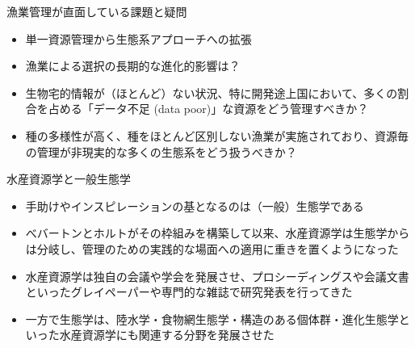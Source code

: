 \documentclass[
  ignorenonframetext,
]{beamer}
\providecommand{\tightlist}{%
  \setlength{\itemsep}{0pt}\setlength{\parskip}{0pt}}
\newcommand{\vspacelarge}{\vspace{6mm}}
\begin{document}
\begin{frame}{漁業管理が直面している課題と疑問}
\protect\hypertarget{ux6f01ux696dux7ba1ux7406ux304cux76f4ux9762ux3057ux3066ux3044ux308bux8ab2ux984cux3068ux7591ux554f}{}

\begin{itemize}
\tightlist
\item
  単一資源管理から生態系アプローチへの拡張\\
  \vspacelarge
\item
  漁業による選択の長期的な進化的影響は？\\
  \vspacelarge
\item
  生物宅的情報が（ほとんど）ない状況、特に開発途上国において、多くの割合を占める「データ不足
  (data poor)」な資源をどう管理すべきか？\\
  \vspacelarge
\item
  種の多様性が高く、種をほとんど区別しない漁業が実施されており、資源毎の管理が非現実的な多くの生態系をどう扱うべきか？
\end{itemize}

\end{frame}

\begin{frame}{水産資源学と一般生態学}
\protect\hypertarget{ux6c34ux7523ux8cc7ux6e90ux5b66ux3068ux4e00ux822cux751fux614bux5b66}{}

\begin{itemize}
\tightlist
\item
  手助けやインスピレーションの基となるのは（一般）生態学である\\
  \vspacelarge
\item
  べバートンとホルトがその枠組みを構築して以来、水産資源学は生態学からは分岐し、管理のための実践的な場面への適用に重きを置くようになった\\
  \vspacelarge
\item
  水産資源学は独自の会議や学会を発展させ、プロシーディングスや会議文書といったグレイペーパーや専門的な雑誌で研究発表を行ってきた\\
  \vspacelarge
\item
  一方で生態学は、陸水学・食物網生態学・構造のある個体群・進化生態学といった水産資源学にも関連する分野を発展させた
\end{itemize}

\end{frame}
\end{document}
